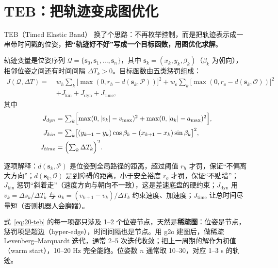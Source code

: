 \section{TEB：把轨迹变成图优化}\label{sec:20-teb}

TEB（Timed Elastic Band）\cite{rosmann2012teb} 换了个思路：不再枚举控制，而是把轨迹表示成一串带时间戳的位姿，\textbf{把“轨迹好不好”写成一个目标函数，用图优化求解}。

轨迹变量是位姿序列 $\mathcal{Q}=\{\bm{s}_0,\bm{s}_1,\dots,\bm{s}_n\}$，其中 $\bm{s}_k=(x_k,y_k,\beta_k)$（$\beta_k$ 为朝向），相邻位姿之间还有时间间隔 $\Delta T_k>0$。目标函数由五类惩罚组成：
\begin{equation}
\begin{aligned}
J(\mathcal{Q},\Delta T)=\;&
w_h\sum_k \bigl[\max(0,r_h-d(\bm{s}_k,\mathcal{P}))\bigr]^2
+w_o\sum_k \bigl[\max(0,r_o-d(\bm{s}_k,\mathcal{O}))\bigr]^2\\
&+J_{\mathrm{kin}}+J_{\mathrm{dyn}}+J_{\mathrm{time}},
\end{aligned}
\label{eq:20-teb}
\end{equation}
其中
\begin{align}
  J_{dyn} &= \textstyle\sum_k \Bigl[\max(0,\left\lvert v_k \right\rvert-v_{\max})^2+\max(0,\left\lvert a_k \right\rvert-a_{\max})^2\Bigr], \label{eq:20-teb-dyn}\\
  J_{kin} &= \textstyle\sum_k \bigl[(y_{k+1}-y_k)\cos\beta_k-(x_{k+1}-x_k)\sin\beta_k\bigr]^2, \label{eq:20-teb-kin}\\
  J_{time} &= \Bigl(\textstyle\sum_k \Delta T_k\Bigr)^2. \label{eq:20-teb-time}
\end{align}

逐项解释：$d(\bm{s}_k,\mathcal{P})$ 是位姿到全局路径的距离，超过阈值 $r_h$ 才罚，保证“不偏离大方向”；$d(\bm{s}_k,\mathcal{O})$ 是到障碍的距离，小于安全裕度 $r_o$ 才罚，保证“不贴墙”；$J_{\mathrm{kin}}$ 惩罚“斜着走”（速度方向与朝向不一致），这是差速底盘的硬约束；$J_{\mathrm{dyn}}$ 用 $v_k=\Delta s_k/\Delta T_k$ 与 $a_k=(v_{k+1}-v_k)/\Delta T_k$ 约束速度、加速度；$J_{\mathrm{time}}$ 让总时间尽量短（否则机器人会磨蹭）。

式~\eqref{eq:20-teb} 的每一项都只涉及 1--2 个位姿节点，天然是\textbf{稀疏图}：位姿是节点，惩罚项是超边（hyper-edge），时间间隔也是节点。用 g2o\cite{kummerle2011g2o} 建图后，做稀疏 Levenberg--Marquardt 迭代，通常 2--5 次迭代收敛；把上一周期的解作为初值（warm start），10--20 Hz 完全能跑。位姿数 $n$ 通常取 10--30，对应 1--3 s 的轨迹。

